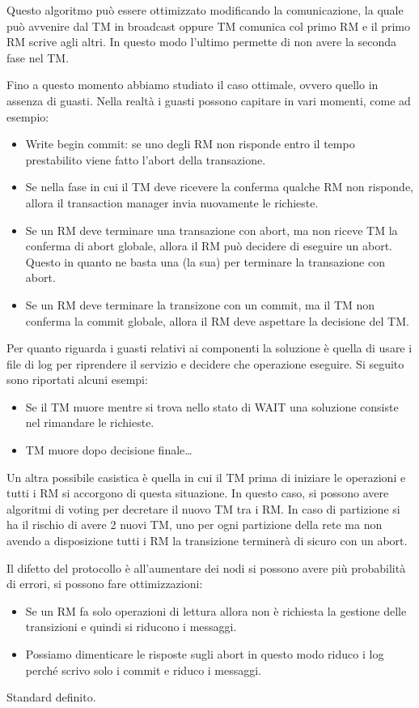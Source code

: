 Questo algoritmo può essere ottimizzato modificando la comunicazione, la quale
può avvenire dal TM in broadcast oppure TM comunica col primo RM e il primo RM
scrive agli altri. In questo modo l'ultimo permette di non avere la seconda fase
nel TM.

Fino a questo momento abbiamo studiato il caso ottimale, ovvero quello in assenza
di guasti. Nella realtà i guasti possono capitare in vari momenti, come ad esempio:
\begin{itemize}
    \item Write begin commit: se uno degli RM non risponde entro il tempo
          prestabilito viene fatto l'abort della transazione.
    \item Se nella fase in cui il TM deve ricevere la conferma qualche RM non
          risponde, allora il transaction manager invia nuovamente le richieste.
    \item Se un RM deve terminare una transazione con abort, ma non riceve TM
          la conferma di abort globale, allora il RM può decidere di eseguire
          un abort. Questo in quanto ne basta una (la sua) per terminare la
          transazione con abort.
    \item Se un RM deve terminare la transizone con un commit, ma il TM non
          conferma la commit globale, allora il RM deve aspettare la decisione
          del TM.
\end{itemize}
Per quanto riguarda i guasti relativi ai componenti la soluzione è quella di
usare i file di log per riprendere il servizio e decidere che operazione eseguire.
Si seguito sono riportati alcuni esempi:
\begin{itemize}
    \item Se il TM muore mentre si trova nello stato di WAIT una soluzione
          consiste nel rimandare le richieste.
    \item TM muore dopo decisione finale\dots
\end{itemize}

Un altra possibile casistica è quella in cui il TM prima di iniziare le operazioni
e tutti i RM si accorgono di questa situazione. In questo caso, si possono avere
algoritmi di voting per decretare il nuovo TM tra i RM. In caso di partizione si
ha il rischio di avere 2 nuovi TM, uno per ogni partizione della rete ma non
avendo a disposizione tutti i RM la transizione terminerà di sicuro con un abort.

Il difetto del protocollo è all'aumentare dei nodi si possono avere più probabilità
di errori, si possono fare ottimizzazioni:
\begin{itemize}
    \item Se un RM fa solo operazioni di lettura allora non è richiesta la
          gestione delle transizioni e quindi si riducono i messaggi.
    \item Possiamo dimenticare le risposte sugli abort in questo modo riduco
          i log perché scrivo solo i commit e riduco i messaggi.
\end{itemize}

Standard definito.